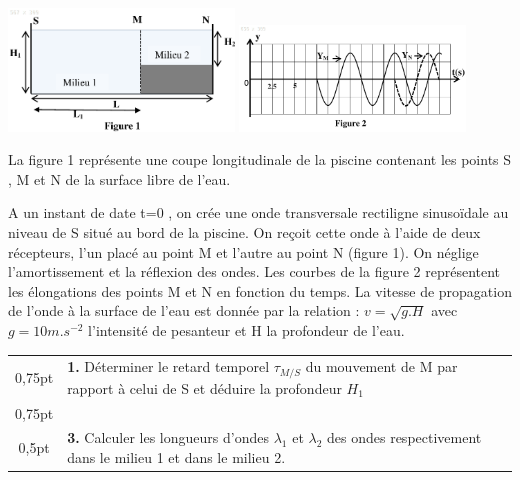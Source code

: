 \documentclass[12pt]{article}
\begin{document}
\begin{center}
	\includegraphics[width=0.45\textwidth]{./img/Onde_00.png}
	\includegraphics[width=0.45\textwidth]{./img/onde_01.png}
  \end{center}
La figure 1 représente une coupe longitudinale de la piscine contenant les points S , M et N de la surface libre de l’eau.

A un instant de date t=0 , on crée une onde transversale rectiligne sinusoïdale au niveau de S situé au bord de la piscine. On reçoit cette onde à l’aide de deux récepteurs, l’un placé au point M et
l’autre au point N (figure 1).
On néglige l’amortissement et la réflexion des ondes.
Les courbes de la figure 2 représentent les élongations des points M et N en fonction du temps.
La vitesse de propagation de l’onde à la surface de l’eau est donnée par la relation : $v = \sqrt{g.H}$ avec $g=10m.s^{-2}$ l’intensité de pesanteur et H la profondeur de l’eau.


  \vspace{0.5cm}
\begin{tabular}{c|l}
  0,75pt & \makecell[l]{\textbf{1. } Déterminer le retard temporel $\tau_{M/S}$ du mouvement de M par rapport à celui de S
et \\déduire la profondeur $H_1$}\\

	0,75pt & \makecell[l]{\textbf{2. } Calculer la profondeur $H_2$ . }\\
	
	0,5pt & \makecell[l]{\textbf{3. } Calculer les longueurs d’ondes $\lambda_1$ et $\lambda_2$ des ondes respectivement dans le milieu 1\\ et dans le milieu 2.}\\
	
	\end{tabular}
\end{document}
